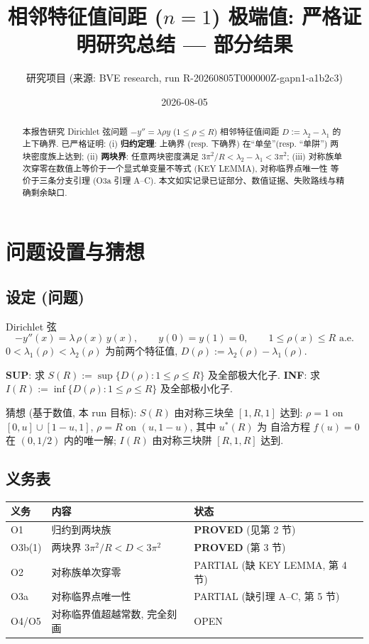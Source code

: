 \documentclass[UTF8]{ctexart}
\title{相邻特征值间距 ($n=1$) 极端值: 严格证明研究总结 --- 部分结果}
\author{研究项目 (来源: BVE research, run R-20260805T000000Z-gapn1-a1b2c3)}
\date{2026-08-05}
\begin{document}
\maketitle

\begin{abstract}
本报告研究 Dirichlet 弦问题 $-y''=\lambda\rho y$ ($1\le\rho\le R$) 相邻特征值间距
$D:=\lambda_2-\lambda_1$ 的上下确界. 已严格证明: (i) \textbf{归约定理}:
上确界 (resp. 下确界) 在``单垒''(resp. ``单阱'') 两块密度族上达到;
(ii) \textbf{两块界}: 任意两块密度满足 $3\pi^2/R < \lambda_2-\lambda_1 < 3\pi^2$;
(iii) 对称族单次穿零在数值上等价于一个显式单变量不等式 (KEY LEMMA), 对称临界点唯一性
等价于三条分支引理 (O3a 引理 A--C). 本文如实记录已证部分、数值证据、失败路线与精确剩余缺口.
\end{abstract}

\tableofcontents

\section{问题设置与猜想}

\subsection{设定 (问题)}

Dirichlet 弦
\begin{equation}
	-y''(x) = \lambda\,\rho(x)\, y(x), \qquad y(0) = y(1) = 0,
	\qquad 1 \le \rho(x) \le R \text{ a.e.}
\end{equation}
$0 < \lambda_1(\rho) < \lambda_2(\rho)$ 为前两个特征值,
$D(\rho) := \lambda_2(\rho) - \lambda_1(\rho)$.

\medskip
\noindent\textbf{SUP}: 求 $S(R) := \sup\{D(\rho): 1\le\rho\le R\}$ 及全部极大化子.
\textbf{INF}: 求 $I(R) := \inf\{D(\rho): 1\le\rho\le R\}$ 及全部极小化子.

猜想 (基于数值, 本 run 目标): $S(R)$ 由对称三块垒 $[1,R,1]$ 达到:
$\rho = 1$ on $[0,u]\cup[1-u,1]$, $\rho = R$ on $(u,1-u)$, 其中 $u^*(R)$ 为
自洽方程 $f(u)=0$ 在 $(0,1/2)$ 内的唯一解; $I(R)$ 由对称三块阱 $[R,1,R]$ 达到.

\subsection{义务表}

\begin{center}
\begin{tabular}{lll}
\toprule
义务 & 内容 & 状态 \\
\midrule
O1 & 归约到两块族 & \textbf{PROVED} (见第 2 节) \\
O3b(1) & 两块界 $3\pi^2/R < D < 3\pi^2$ & \textbf{PROVED} (第 3 节) \\
O2 & 对称族单次穿零 & PARTIAL (缺 KEY LEMMA, 第 4 节) \\
O3a & 对称临界点唯一性 & PARTIAL (缺引理 A--C, 第 5 节) \\
O4/O5 & 对称临界值超越常数, 完全刻画 & OPEN \\
\bottomrule
\end{tabular}
\end{center}
\end{document}
